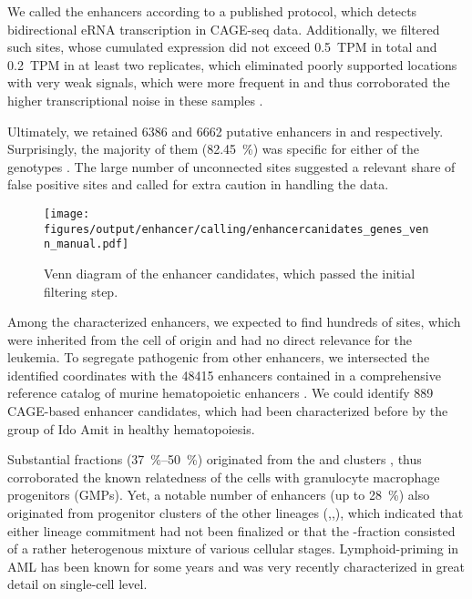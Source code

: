  We called the enhancers according to a published protocol\cite{Andersson2014}, which detects bidirectional eRNA transcription in CAGE-seq data\supple. Additionally, we filtered such sites, whose cumulated expression did not exceed \SI{0.5}{TPM} in total and \SI{0.2}{TPM} in at least two replicates, which eliminated poorly supported locations with very weak signals, which were more frequent in \dnmtwt and thus corroborated the higher transcriptional noise in these samples \supplefig.
 
Ultimately, we retained \num{6386} and \num{6662} putative enhancers in \dnmtwt and \dnmtchip respectively.
Surprisingly, the majority of them (\SI{82.45}{\percent}) was specific for either of the genotypes . The large number of unconnected sites suggested a relevant share of false positive sites and called for extra caution in handling the data.

\begin{figure}[!htb]
	\centering \vspace{-1em}
	\texttt{[image: figures/output/enhancer/calling/enhancercanidates\_genes\_venn\_manual.pdf]} 
	\caption{Venn diagram of the enhancer candidates, which passed the initial filtering step.}
	\label{fig:enhancers:enhancercanidates_venn_manual}
\end{figure}

Among the characterized enhancers, we expected to find hundreds of sites, which were inherited from the cell of origin and had no direct relevance for the leukemia. To segregate pathogenic from other enhancers, we intersected the identified coordinates with the \num{48415} enhancers contained in a comprehensive reference catalog of murine hematopoietic enhancers \cite{Lara-Astiaso2014}. We could identify \num{889} CAGE-based enhancer candidates, which had been characterized before by the group of Ido Amit in healthy hematopoiesis. 

Substantial fractions (\SIrange{37}{50}{\percent}) originated from the  \amittwo and \amitsix clusters , thus corroborated the known relatedness of the \mllafnine \lsk cells with granulocyte macrophage progenitors (GMPs). Yet, a notable number of enhancers (up to \SI{28}{\percent}) also originated from progenitor clusters of the other lineages (,,), which indicated that either lineage commitment had not been finalized or that the \kitpos-fraction consisted of a rather heterogenous mixture of various cellular stages. Lymphoid-priming in AML has been known for some years\cite{Goardon2011,Corces2016} and was very recently characterized in great detail on single-cell level\cite{Granja2019}. 

